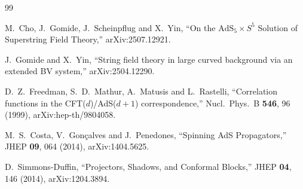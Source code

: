 \documentclass[11pt]{article}
\begin{document}
\begin{thebibliography}{99}

M.~Cho, J.~Gomide, J.~Scheinpflug and X.~Yin,
``On the $\mathrm{AdS}_5\times S^5$ Solution of Superstring Field Theory,''
arXiv:2507.12921.

J.~Gomide and X.~Yin,
``String field theory in large curved background via an extended BV system,''
arXiv:2504.12290.

D.~Z.~Freedman, S.~D.~Mathur, A.~Matusis and L.~Rastelli,
``Correlation functions in the CFT($d$)/AdS($d{+}1$) correspondence,''
Nucl.\ Phys.\ B {\bf 546}, 96 (1999), arXiv:hep-th/9804058.

M.~S.~Costa, V.~Gon\c{c}alves and J.~Penedones,
``Spinning AdS Propagators,''
JHEP {\bf 09}, 064 (2014), arXiv:1404.5625.

D.~Simmons-Duffin,
``Projectors, Shadows, and Conformal Blocks,''
JHEP {\bf 04}, 146 (2014), arXiv:1204.3894.

\end{thebibliography}
\end{document}
